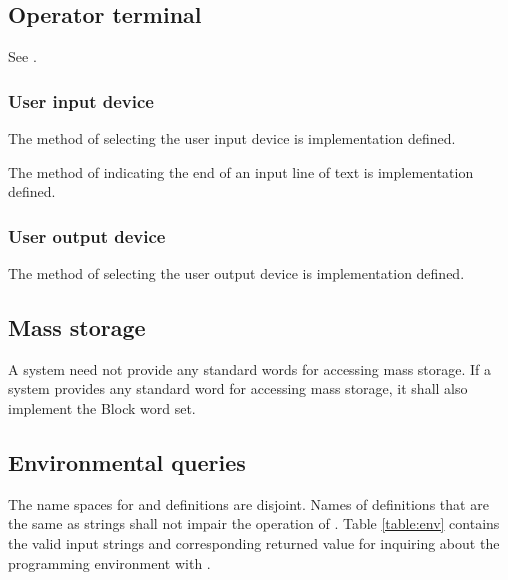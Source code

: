 \subsection{Operator terminal} %

See .

\subsubsection{User input device} %
\label{usage:input}

The method of selecting the user input device is implementation
defined.

The method of indicating the end of an input line of text is
implementation defined.

\subsubsection{User output device} %
\label{usage:output}

The method of selecting the user output device is implementation
defined.

\subsection{Mass storage} %

A system need not provide any standard words for accessing mass
storage. If a system provides any standard word for accessing
mass storage, it shall also implement the Block word set.

\subsection{Environmental queries} %
\label{usage:env}

The name spaces for  and definitions are
disjoint. Names of definitions that are the same as
 strings shall not impair the operation of
. Table \ref{table:env} contains
the valid input strings and corresponding returned value for
inquiring about the programming environment with
.


